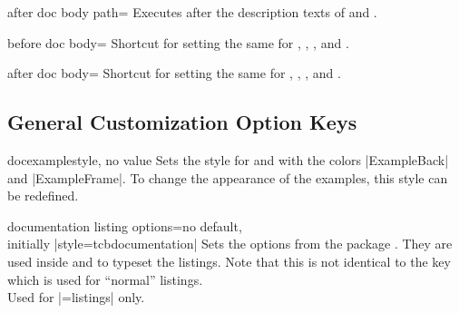 \begin{docTcbKey}[][doc new=2019-09-18]{after doc body path}{=}{\tcbdocdescInitEmpty}
  Executes  after the description texts
  of  and .
\end{docTcbKey}


\begin{docTcbKey}[][doc new and updated={2015-10-09}{2019-09-18}]{before doc body}{=}{\tcbdocdescInitEmpty}
  Shortcut for setting the same  for
  , ,
  , and .
\end{docTcbKey}

\begin{docTcbKey}[][doc new and updated={2015-10-09}{2019-09-18}]{after doc body}{=}{\tcbdocdescInitEmpty}
  Shortcut for setting the same  for
  , ,
  , and .
\end{docTcbKey}


\clearpage
\subsection{General Customization Option Keys}

\begin{docTcbKey}[][doc updated=2015-03-16]{docexample}{}{style, no value}
  Sets the style for  and 
  with the colors |ExampleBack| and |ExampleFrame|.
  To change the appearance of the examples, this style can be
  redefined.
\begin{dispListing}
\end{dispListing}
\end{docTcbKey}

\begin{docTcbKey}{documentation listing options}{=}{no default,\\\hspace*{\fill} initially |style=tcbdocumentation|}
  Sets the options from the package  \cite{hoffmann:listings}.
  They are used inside  and  to typeset
  the listings. Note that this is not identical to the key
   which is used for \enquote{normal} listings.\\
  Used for |=listings| only.
\end{docTcbKey}

